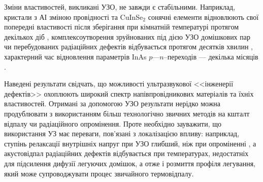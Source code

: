 %
%
%
%
%
%
%
%
%


Зміни властивостей, викликані УЗО, не завжди є стабільними.
Наприклад, кристали з АІ зміною провідності та  CuInSe$_2$ сонячні елементи відновлюють свої попередні властивості після зберігання при кімнатній температурі протягом декількох діб \cite{YOlikh2006TPLr,US:ZnCdTe,BorkovFTT,OstapSC},
комплексоутворення зруйнованих під дією УЗО домішкових пар чи перебудованих радіаційних дефектів відбувається протягом десятків хвилин \cite{Ostapenko1995SST,Ostapenko1995,YOlikh2006TPLr},
характерний час відновлення параметрів InAs $p$---$n$--переходів --- декілька місяців \cite{Teterkin2009r}.



Наведені результати свідчать, що можливості ультразвукової <<інженерії дефектів>> охоплюють широкий спектр напівпровідникових матеріалів та їхніх властивостей.
Отримані за допомогою УЗО результати нерідко можна продублювати з використанням більш технологічно звичних методів на кшталт відпалу чи радіаційного опромінення.
Проте необхідно зауважити, що використання УЗ має переваги, пов'язані з локалізацією впливу:
наприклад, ступінь релаксації внутрішніх напруг при УЗО глибший, ніж при опроміненні \cite{UST:GeGaAs1990},
а акустовідпал радіаційних дефектів \cite{PodolHivr,UST:OstrovCsI,YOlikh2007TPLr} відбувається при температурах, недостатніх для підсилення дифузії легуючих домішок, а отже і розмиття профіля легування, який може супроводжувати процес звичайного термовідпалу.

